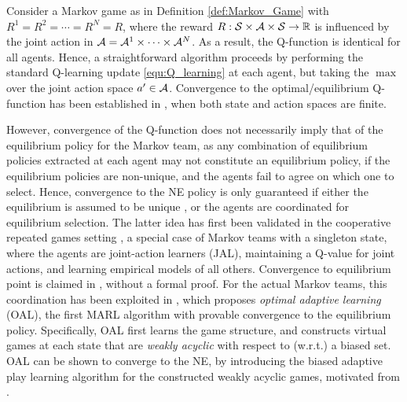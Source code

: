 Consider a Markov game as in Definition \ref{def:Markov_Game} with $R^1=R^2=\cdots=R^N=R$, where  the reward $R:{\mathcal{S}}\times\mathcal{A}\times{\mathcal{S}}\to\mathbb{R}$ is influenced by the joint action in $\mathcal{A}=\mathcal{A}^1\times\cdots\times \mathcal{A}^N$. 
As a result, the Q-function is identical for  all agents. 
Hence, a straightforward algorithm proceeds by performing the standard 
Q-learning update \eqref{equ:Q_learning}  at each agent, but taking the $\max$ over the joint action space $a'\in\mathcal{A}$. Convergence to the optimal/equilibrium Q-function has been established  in \cite{szepesvari1999unified,littman2001value}, when both state and action spaces are finite.

However,  convergence of the Q-function does not necessarily imply that of the equilibrium policy  for the Markov team, as any combination of  equilibrium policies extracted at each agent may not constitute an equilibrium policy, if the equilibrium policies are non-unique, and the agents fail to agree on which one to select. Hence, convergence to the NE policy is only guaranteed if either the equilibrium is assumed to be unique \cite{littman2001value}, or the agents are coordinated for equilibrium selection.  The latter idea has first been validated in the cooperative repeated games setting \cite{claus1998dynamics},  a special case of Markov teams with a singleton state, where  the agents are joint-action learners (JAL),  maintaining a Q-value for joint actions, and learning  empirical models of all others. Convergence to equilibrium point is claimed  in \cite{claus1998dynamics}, without a formal proof. 
For the actual Markov teams, this coordination has been exploited in  \cite{wang2003reinforcement}, which proposes \emph{optimal adaptive learning} (OAL), the first MARL algorithm   with provable  convergence to the equilibrium policy.  Specifically, OAL first learns the game structure, and constructs virtual games at each state that are \emph{weakly acyclic} with respect  to (w.r.t.) a biased set. OAL can be shown to converge to the NE, by introducing the biased adaptive play learning algorithm for the constructed  weakly acyclic games, motivated from \cite{young1993evolution}.  


